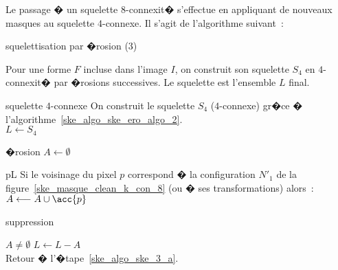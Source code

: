 Le passage � un squelette $8$-connexit� s'effectue en appliquant de nouveaux masques au squelette $4$-connexe. Il s'agit de l'algorithme suivant~:



        \begin{xalgorithm}{squelettisation par �rosion (3)}
        \label{ske_algo_ske_ero_algo_3}
        
        Pour une forme $F$ incluse dans l'image $I$, on construit son squelette $S_4$ en 
        $4$-connexit� par �rosions successives. Le squelette est l'ensemble $L$ final.
        
        \begin{xalgostep}{squelette $4$-connexe}
                On construit le squelette $S_4$ ($4$-connexe) gr�ce � l'algorithme~\ref{ske_algo_ske_ero_algo_2}. \\
                $L \longleftarrow S_4$
        \end{xalgostep}
        
        \begin{xalgostep}{�rosion}\label{ske_algo_ske_3_a}
                $A \longleftarrow \emptyset$ \\
                \begin{xforeach}{p}{L}
                Si le voisinage du pixel $p$ correspond � la configuration $N'_1$ de la 
                figure~\ref{ske_masque_clean_k_con_8} (ou � ses transformations) alors~: 
                $A \longleftarrow A \cup \acc{p}$
                \end{xforeach}
        \end{xalgostep}
        
        \begin{xalgostep}{suppression}\label{ske_algo_ske_3_b}
                \begin{xif}{$A \neq \emptyset$}
                    $L \longleftarrow L - A$ \\
                    Retour � l'�tape~\ref{ske_algo_ske_3_a}.
                \end{xif}        
        \end{xalgostep}
                
        
        \end{xalgorithm}
        
        
        
        



